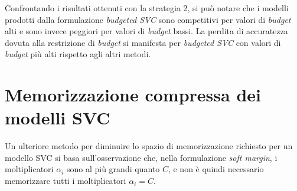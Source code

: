 Confrontando i risultati ottenuti con la strategia 2, si può notare che i modelli prodotti dalla formulazione \emph{budgeted SVC} sono competitivi per valori di \emph{budget} alti e sono invece peggiori per valori di \emph{budget} bassi. 
La perdita di accuratezza dovuta alla restrizione di \emph{budget} si manifesta per \emph{budgeted SVC} con valori di \emph{budget} più alti rispetto agli altri metodi.

\section{Memorizzazione compressa dei modelli SVC}\label{sec:memorizzazione_compressa}
Un ulteriore metodo per diminuire lo spazio di memorizzazione richiesto per un modello SVC si basa sull'osservazione che, nella formulazione \emph{soft margin}, i moltiplicatori $\alpha_i$ sono al più grandi quanto $C$, e non è quindi necessario memorizzare tutti i moltiplicatori $\alpha_i = C$.

